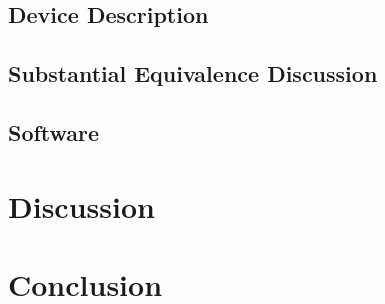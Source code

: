 \documentclass{article}
\begin{document}
\subsection{Device Description}
\subsection{Substantial Equivalence Discussion}





\subsection{Software}




\section{Discussion}
\label{sec:discussion}

\section{Conclusion}
\label{sec:conclusion}


\newpage
{}


\end{document}
